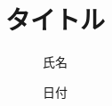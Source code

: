 \documentclass[a4paper,11pt]{jsarticle}
\title{タイトル}
\author{氏名}
\date{日付}
\begin{document}
\maketitle
\tableofcontents
\newpage





\nocite{*}
\end{document}
